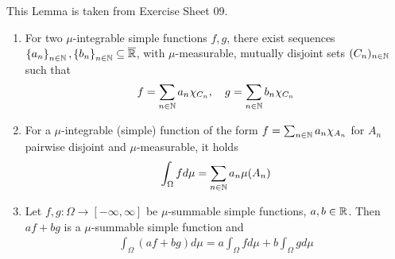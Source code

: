 \begin{lem}[]\label{lem:linearity-simple-integral}
  This Lemma is taken from Exercise Sheet 09.
  \begin{enumerate}
    \item For two $\mu$-integrable simple functions $f,g$,
      there exist sequences
      $\left\{a_n\right\}_{n \in \mathbb{N}}, \left\{b_n\right\}_{n \in \mathbb{N}} \subseteq \overline{\mathbb{R}}$,
      with
      $\mu$-measurable, mutually disjoint sets
      $(C_n)_{n \in \mathbb{N}}$
      such that
      \begin{align*}
        f = \sum_{n \in \mathbb{N}}a_n \chi_{C_n}, \quad g = \sum_{n \in \mathbb{N}}b_n \chi_{C_n}
      \end{align*}
    \item For a $\mu$-integrable (simple) function of the form $f = \sum_{n \in \mathbb{N}} a_n \chi_{A_n}$ for $A_{n}$ pairwise disjoint and $\mu$-measurable, it holds
      \begin{align*}
        \int_{\Omega} f d \mu = \sum_{n \in \mathbb{N}} a_n \mu(A_n) 
      \end{align*}
    \item Let $f,g: \Omega \to [-\infty,\infty]$ be $\mu$-summable simple functions, $a,b \in \mathbb{R}$. Then
      $af + bg$ is a $\mu$-summable simple function and
      \begin{align*}
        \int_{\Omega} (af + bg) d \mu = a\int_{\Omega} f d \mu + b\int_{\Omega} g d \mu
      \end{align*}
  \end{enumerate}
\end{lem}

